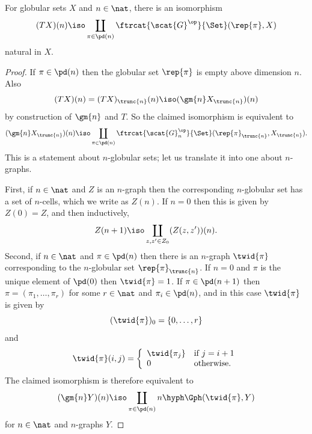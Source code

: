 \begin{propn}	\label{propn:pds-formula}%
%
%
For globular sets $X$ and $n\in\nat$, there is an isomorphism
\[
(TX)(n) 
\iso 
\coprod_{\pi\in\pd(n)} 
\ftrcat{\scat{G}^\op}{\Set} (\rep{\pi}, X)
\]
natural in $X$.
\end{propn}
%
\begin{proof}
If $\pi\in\pd(n)$ then the globular set $\rep{\pi}$ is empty above
dimension $n$.  Also
\[
(TX)(n) = (TX)_{\trunc{n}}(n) \iso (\gm{n} X_{\trunc{n}})(n)
\]
by construction of $\gm{n}$ and $T$.  So the claimed isomorphism is equivalent
to
\[
(\gm{n} X_{\trunc{n}})(n) 
\iso 
\coprod_{\pi\in\pd(n)} 
\ftrcat{\scat{G}_n^\op}{\Set} (\rep{\pi}_{\trunc{n}}, X_{\trunc{n}}).
\]
This is a statement about $n$-globular sets; let us translate it into one
about $n$-graphs.

First, if $n\in\nat$ and $Z$ is an $n$-graph then the corresponding
$n$-globular set has a set of $n$-cells, which we write as $Z(n)$.  If
$n=0$ then this is given by $Z(0) = Z$, and then inductively,
\[
Z(n+1) \iso \coprod_{z,z'\in Z_0} (Z(z,z'))(n).
\]
Second, if $n\in\nat$ and $\pi\in\pd(n)$ then there is an $n$-graph
$\twid{\pi}$ corresponding to the $n$-globular set $\rep{\pi}_{\trunc{n}}$.
If $n=0$ and $\pi$ is the unique element of $\pd(0)$ then $\twid{\pi} = 1$.
If $\pi\in\pd(n+1)$ then $\pi = (\pi_1, \ldots, \pi_r)$ for some $r\in\nat$
and $\pi_i \in \pd(n)$, and in this case $\twid{\pi}$ is given by
\[
(\twid{\pi})_0 = \{ 0, \ldots, r \}
\]
and
\[
\twid{\pi}(i,j)
=
\left\{
\begin{array}{ll}
\twid{\pi_j}	&\textrm{if } j = i+1	\\
0		&\textrm{otherwise.}
\end{array}
\right.
\]
The claimed isomorphism is therefore equivalent to 
\[
(\gm{n} Y)(n) 
\iso 
\coprod_{\pi\in\pd(n)}
n\hyph\Gph (\twid{\pi}, Y)
\]
for $n\in\nat$ and $n$-graphs $Y$.  


\end{proof}
